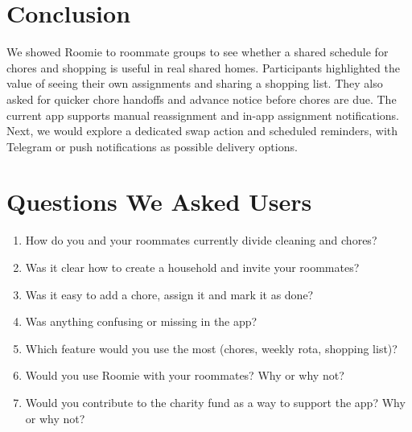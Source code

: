 \documentclass[11pt,a4paper]{article}
\begin{document}
\section{Conclusion}
We showed Roomie to roommate groups to see whether a shared schedule for chores and
shopping is useful in real shared homes. Participants highlighted the value of seeing their own assignments and sharing
a shopping list. They also asked for quicker chore handoffs and advance notice
before chores are due. The current app supports manual reassignment and in-app
assignment notifications. Next, we would explore a dedicated swap action and
scheduled reminders, with Telegram or push notifications as possible delivery
options.

\appendix
\section{Questions We Asked Users}
\begin{enumerate}[noitemsep]
  \item How do you and your roommates currently divide cleaning and chores?
  \item Was it clear how to create a household and invite your roommates?
  \item Was it easy to add a chore, assign it and mark it as done?
  \item Was anything confusing or missing in the app?
  \item Which feature would you use the most (chores, weekly rota, shopping list)?
  \item Would you use Roomie with your roommates? Why or why not?
  \item Would you contribute to the charity fund as a way to support the app? Why or why not?
\end{enumerate}
\end{document}
